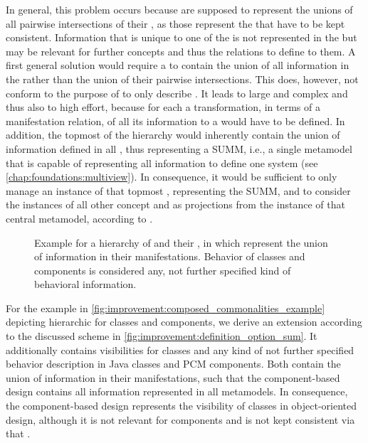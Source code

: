 In general, this problem occurs because \conceptmetamodels are supposed to represent the unions of all pairwise intersections of their \concretemetamodels, as those represent the \commonalities that have to be kept consistent.
Information that is unique to one of the \concretemetamodels is not represented in the \conceptmetamodel but may be relevant for further concepts and thus the relations to define to them.
A first general solution would require a \conceptmetamodel to contain the union of all information in the \concretemetamodels rather than the union of their pairwise intersections.
This does, however, not conform to the purpose of \conceptmetamodels to only describe \commonalities.
It leads to large and complex \conceptmetamodels and thus also to high effort, because for each \concretemetamodel a transformation, in terms of a manifestation relation, of all its information to a \conceptmetamodel would have to be defined.
In addition, the topmost \conceptmetamodel of the hierarchy would inherently contain the union of information defined in all \concretemetamodels, thus representing a \gls{SUMM}, i.e., a single metamodel that is capable of representing all information to define one system (see \autoref{chap:foundations:multiview}).
In consequence, it would be sufficient to only manage an instance of that topmost \conceptmetamodel, representing the \gls{SUMM}, and to consider the instances of all other concept and \concretemetamodels as projections from the instance of that central metamodel, according to \textcite{atkinson2010a}.

\begin{figure}
    \centering
    
    \caption[\Commonalities with union of all information]{Example for a hierarchy of \conceptmetamodels and their \commonalities, in which \conceptmetamodels represent the union of information in their manifestations. Behavior of classes and components is considered any, not further specified kind of behavioral information.}
    \label{fig:improvement:definition_option_sum}
\end{figure}

For the example in \autoref{fig:improvement:composed_commonalities_example} depicting hierarchic \conceptmetamodels for classes and components, we derive an extension according to the discussed scheme in \autoref{fig:improvement:definition_option_sum}.
It additionally contains visibilities for classes and any kind of not further specified behavior description in Java classes and \gls{PCM} components.
Both \conceptmetamodels contain the union of information in their manifestations, such that the component-based design \conceptmetamodel contains all information represented in all metamodels.
In consequence, the component-based design \conceptmetamodel represents the visibility of classes in object-oriented design, although it is not relevant for components and is not kept consistent via that \conceptmetamodel.

